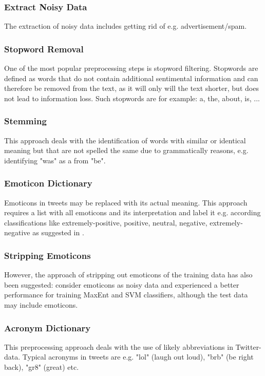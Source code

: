 \documentclass{acm_proc_article-sp}
\begin{document}
\subsubsection{Extract Noisy Data}
The extraction of noisy data includes getting rid of e.g. advertisement/spam. 

\subsubsection{Stopword Removal}
One of the most popular preprocessing steps is stopword filtering. Stopwords are defined as words that do not contain additional sentimental information and can therefore be removed from the text, as it will only will the text shorter, but does not lead to information loss. Such stopwords are for example: a, the, about, is, ...


\subsubsection{Stemming}
This approach deals with the identification of words with similar or identical meaning but that are not spelled the same due to grammatically reasons, e.g. identifying "was" as a from "be".

\subsubsection{Emoticon Dictionary}
Emoticons in tweets may be replaced with its actual meaning. This approach requires a list with all emoticons and its interpretation and label it e.g. according classifications like extremely-positive, positive, neutral, negative, extremely-negative as suggested in \cite{agarwal2011sentiment}.

\subsubsection{Stripping Emoticons}
However, the approach of stripping out emoticons of the training data has also been suggested: \cite{go2009twitter} consider emoticons as noisy data and experienced a better performance for training MaxEnt and SVM classifiers, although the test data may include emoticons.

\subsubsection{Acronym Dictionary}
This preprocessing approach deals with the use of likely abbreviations in Twitter-data. 
Typical acronyms in tweets are e.g. "lol" (laugh out loud), "brb" (be right back), "gr8" (great) etc.
\end{document}
